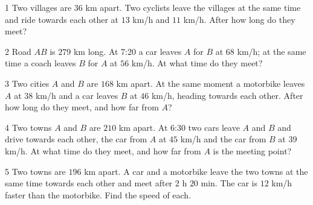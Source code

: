 \begin{probbox}{1}{\relax}
Two villages are $36$ km apart. Two cyclists leave the villages at the same time and ride towards each other at $13$ km/h and $11$ km/h. After how long do they meet?
\end{probbox}
\gap
\begin{probbox}{2}{\relax}
Road $AB$ is $279$ km long. At 7:20 a car leaves $A$ for $B$ at $68$ km/h; at the same time a coach leaves $B$ for $A$ at $56$ km/h. At what time do they meet?
\end{probbox}
\gap
\begin{probbox}{3}{\relax}
Two cities $A$ and $B$ are $168$ km apart. At the same moment a motorbike leaves $A$ at $38$ km/h and a car leaves $B$ at $46$ km/h, heading towards each other. After how long do they meet, and how far from $A$?
\end{probbox}
\gap
\begin{probbox}{4}{\relax}
Two towns $A$ and $B$ are $210$ km apart. At 6:30 two cars leave $A$ and $B$ and drive towards each other, the car from $A$ at $45$ km/h and the car from $B$ at $39$ km/h. At what time do they meet, and how far from $A$ is the meeting point?
\end{probbox}
\gap
\begin{probbox}{5}{\relax}
Two towns are $196$ km apart. A car and a motorbike leave the two towns at the same time towards each other and meet after $2$ h $20$ min. The car is $12$ km/h faster than the motorbike. Find the speed of each.
\end{probbox}
